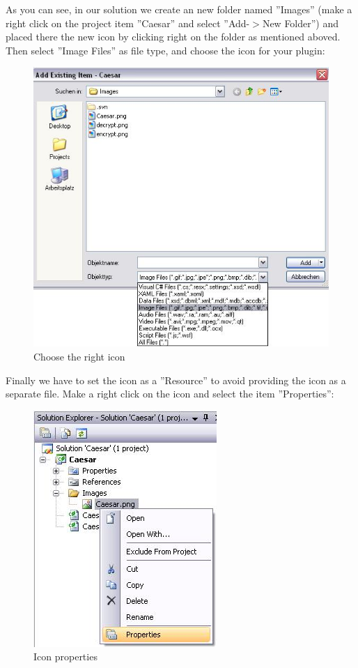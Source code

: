 As you can see, in our solution we create an new folder named ''Images'' (make a right click on the project item ''Caesar'' and select ''Add-$>$New Folder'') and placed there the new icon by clicking right on the folder as mentioned aboved.\clearpage
Then select ''Image Files'' as file type, and choose the icon for your plugin:
\begin{figure}[h!]
	\centering
		\includegraphics{figures/choose_icon.jpg}
	\caption{Choose the right icon}
	\label{fig:choose_icon}
\end{figure}
Finally we have to set the icon as a ''Resource'' to avoid providing the icon as a separate file. Make a right click on the icon and select the item ''Properties'':\clearpage
\begin{figure}[h!]
	\centering
		\includegraphics{figures/icon_properties.jpg}
	\caption{Icon properties}
	\label{fig:icon_properties}
\end{figure}
